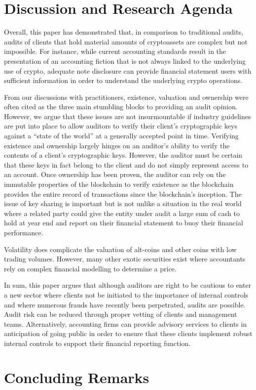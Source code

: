 \section{Discussion and Research Agenda}

Overall, this paper has demonstrated that, in comparison to traditional audits, audits of clients that hold material amounts of cryptoassets are complex but not impossible. For instance, while current accounting standards result in the presentation of an accounting fiction that is not always linked to the underlying use of crypto, adequate note disclosure can provide financial statement users with sufficient information in order to understand the underlying crypto operations. 

From our discussions with practitioners, existence, valuation and ownership were often cited as the three main stumbling blocks to providing an audit opinion. However, we argue that these issues are not insurmountable if industry guidelines are put into place to allow auditors to verify their client’s cryptographic keys against a “state of the world” at a generally accepted point in time. Verifying existence and ownership largely hinges on an auditor’s ability to verify the contents of a client’s cryptographic keys. However, the auditor must be certain that these keys in fact belong to the client and do not simply represent access to an account. Once ownership has been proven, the auditor can rely on the immutable properties of the blockchain to verify existence as the blockchain provides the entire record of transactions since the blockchain’s inception. The issue of key sharing is important but is not unlike a situation in the real world where a related party could give the entity under audit a large sum of cash to hold at year end and report on their financial statement to buoy their financial performance. 

Volatility does complicate the valuation of alt-coins and other coins with low trading volumes. However, many other exotic securities exist where accountants rely on complex financial modelling to determine a price. 

In sum, this paper argues that although auditors are right to be cautious to enter a new sector where clients not be initiated to the importance of internal controls and where numerous frauds have recently been perpetrated, audits are possible. Audit risk can be reduced through proper vetting of clients and management teams. Alternatively, accounting firms can provide advisory services to clients in anticipation of going public in order to ensure that these clients implement robust internal controls to support their financial reporting function. 

\section{Concluding Remarks}


